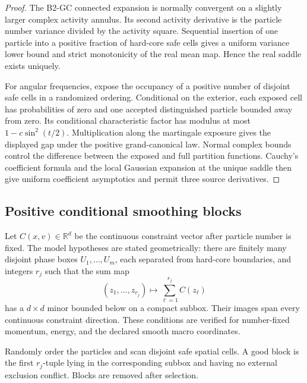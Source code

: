 \begin{proof}
The B2-GC connected expansion is normally convergent on a slightly larger
complex activity annulus.  Its second activity derivative is the particle
number variance divided by the activity square.  Sequential insertion of one
particle into a positive fraction of hard-core safe cells gives a uniform
variance lower bound and strict monotonicity of the real mean map.  Hence the
real saddle exists uniquely.

For angular frequencies, expose the occupancy of a positive number of
disjoint safe cells in a randomized ordering.  Conditional on the exterior,
each exposed cell has probabilities of zero and one accepted distinguished
particle bounded away from zero.  Its conditional characteristic factor has
modulus at most \(1-c\sin^2(t/2)\).  Multiplication along the martingale
exposure gives the displayed gap under the positive grand-canonical law.
Normal complex bounds control the difference between the exposed and full
partition functions.  Cauchy's coefficient formula and the local Gaussian
expansion at the unique saddle then give uniform coefficient asymptotics and
permit three source derivatives.
\end{proof}

\subsection{Positive conditional smoothing blocks}

Let \(C(x,v)\in\mathbb R^d\) be the continuous constraint vector after
particle number is fixed.  The model hypotheses are stated geometrically:
there are finitely many disjoint phase boxes \(U_1,\ldots,U_m\), each separated
from hard-core boundaries, and integers \(r_j\) such that the sum map
\[
 (z_1,\ldots,z_{r_j})\longmapsto
 \sum_{\ell=1}^{r_j}C(z_\ell)
\]
has a \(d\times d\) minor bounded below on a compact subbox.  Their images
span every continuous constraint direction.  These conditions are verified
for number-fixed momentum, energy, and the declared smooth macro coordinates.

Randomly order the particles and scan disjoint safe spatial cells.  A good
block is the first \(r_j\)-tuple lying in the corresponding subbox and having
no external exclusion conflict.  Blocks are removed after selection.

